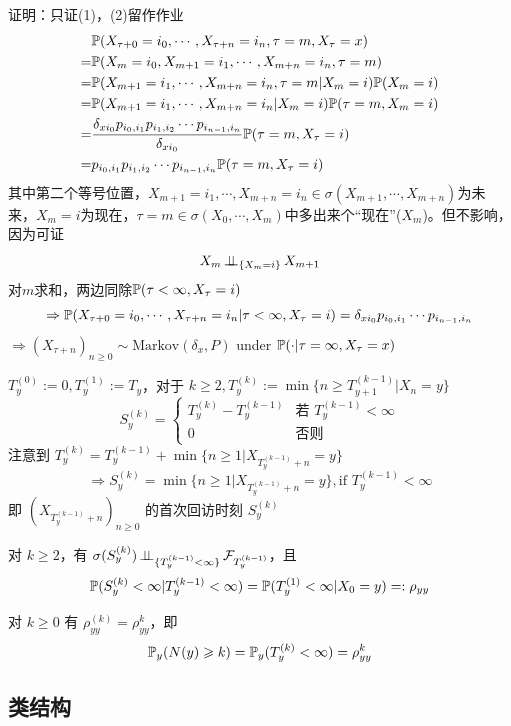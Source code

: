 证明：只证(1)，(2)留作作业
\[
\begin{aligned}
    &\mathbb{P}(X_{\tau+0}=i_0,\cdots,X_{\tau+n}=i_n,\tau=m,X_{\tau}=x)\\
    =&\mathbb{P}(X_m=i_0,X_{m+1}=i_1,\cdots,X_{m+n}=i_n,\tau=m)\\
    =&\mathbb{P}(X_{m+1}=i_1,\cdots,X_{m+n}=i_n,\tau=m|X_m=i)\mathbb{P}(X_m=i)\\
    =&\mathbb{P}(X_{m+1}=i_1,\cdots,X_{m+n}=i_n|X_m=i)\mathbb{P}(\tau=m,X_m=i)\\
    =&\frac{\delta_{xi_0}p_{i_0,i_1}p_{i_1,i_2}\cdots p_{i_{n-1},i_n}}{\delta_{xi_0}}\mathbb{P}(\tau=m,X_{\tau}=i)\\
    =&p_{i_0,i_1}p_{i_1,i_2}\cdots p_{i_{n-1},i_n}\mathbb{P}(\tau=m,X_{\tau}=i)
\end{aligned}
\]
其中第二个等号位置，$X_{m+1}=i_1,\cdots,X_{m+n}=i_n\in \sigma(X_{m+1},\cdots,X_{m+n})$为未来，$X_m=i$为现在，$\tau=m\in \sigma(X_0,\cdots,X_m)$中多出来个“现在”($X_m$)。但不影响，因为可证
\[
X_m\operatorname{\perp\!\!\!\perp}_{\{X_m=i\}}X_{m+1}
\]
对$m$求和，两边同除$\mathbb{P}(\tau<\infty,X_{\tau}=i)$
\[
\Rightarrow \mathbb{P}(X_{\tau+0}=i_0,\cdots,X_{\tau+n}=i_n|\tau<\infty,X_{\tau}=i)=\delta_{xi_0}p_{i_0,i_1}\cdots p_{i_{n-1},i_n}
\]
$\Rightarrow (X_{\tau+n})_{n\geq 0}\sim\text{Markov}(\delta_x,P)$ under $\mathbb{P}(\cdot|\tau=\infty,X_{\tau}=x)$

$T_y^{(0)}:=0, T_y^{(1)}:=T_y$，对于 $k\geq 2, T_y^{(k)}:=\min\{n\geq T_{y+1}^{(k-1)}|X_n=y\}$
\[
S_y^{(k)}=\begin{cases}
    T_y^{(k)}-T_y^{(k-1)}&\text{若 }T_y^{(k-1)}<\infty\\
    0 & \text{否则}
\end{cases}
\]
注意到 $T_y^{(k)}=T_y^{(k-1)}+\min\{n\geq 1|X_{T_y^{(k-1)}+n}=y\}$
\[
\Rightarrow S_y^{(k)}=\min\{n\geq 1|X_{T_y^{(k-1)}+n}=y\}, \text{if }T_y^{(k-1)}<\infty
\]
即 $(X_{T_y^{(k-1)}+n})_{n\geq 0}$ 的首次回访时刻 $S_y^{(k)}$

\begin{lemma}
    对 $k\geq 2$，有 $\sigma(S_y^{(k)})\operatorname{\perp\!\!\!\perp}_{\{T_y^{(k-1)}<\infty\}}\mathcal{F}_{T_y^{(k-1)}}$，且\
    \[
    \mathbb{P}(S_y^{(k)}<\infty|T_y^{(k-1)}<\infty)=\mathbb{P}(T_y^{(1)}<\infty|X_0=y)=:\rho_{yy}
    \]
\end{lemma}

\begin{corollary}
    对 $k\geq 0$ 有 $\rho_{yy}^{(k)}=\rho_{yy}^k$，即
    \[
    \mathbb{P}_y(N(y)\geqslant k)=\mathbb{P}_y(T_y^{(k)}<\infty)=\rho_{yy}^k
    \]
\end{corollary}

\subsection{类结构}
